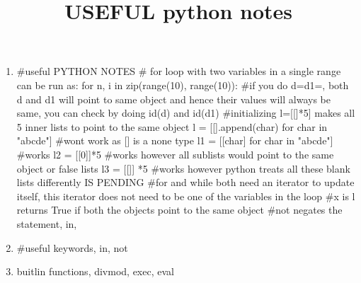 \documentclass{article}
\title {USEFUL python notes}
\begin{document}
 
\maketitle
\begin{enumerate}

\item #useful PYTHON NOTES
# for loop with two variables in a single range can be run as:
for n, i in zip(range(10), range(10)):
#if you do d=d1={}, both d and d1 will point to same object and hence their values will always be same, you can check by doing id(d) and id(d1)
#initializing l=[[]*5] makes all 5 inner lists to point to the same object
l = [[].append(char) for char in "abcde"] #wont work as [] is a none type
l1 = [[char] for char in "abcde"] #works
l2 = [[0]]*5 #works however all sublists would point to the same object or false lists
l3 = [[]] *5 #works however python treats all these blank lists differently IS PENDING    
#for and while both need an iterator to update itself, this iterator does not need to be one of the variables in the loop
#x is l returns True if both the objects point to the same object
#not negates the statement, in, 
\item #useful keywords, in, not
\item buitlin functions, divmod, exec, eval

\end{enumerate}
\end{document}
